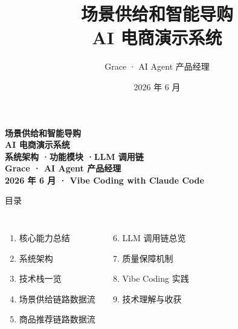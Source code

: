\documentclass[aspectratio=169, UTF8]{ctexbeamer}
\title{场景供给和智能导购\\AI 电商演示系统}
\author{Grace \;·\; AI Agent 产品经理}
\date{2026 年 6 月}
\begin{document}
\begin{frame}[plain]
  \vspace{2cm}
  \begin{center}
    {\huge\bfseries\color{primarydark} 场景供给和智能导购 \\
      \normalsize AI 电商演示系统 \\[1em]
      \Large\color{textgray} 系统架构 \quad·\quad 功能模块 \quad·\quad LLM 调用链 \\[2em]
      \normalsize\color{border} Grace \;·\; AI Agent 产品经理 \\
      2026 年 6 月 \;·\; Vibe Coding with Claude Code
    }
  \end{center}
\end{frame}

\begin{frame}{目录}
  \begin{columns}[T]
    \begin{enumerate}
      \item 核心能力总结
      \item 系统架构
      \item 技术栈一览
      \item 场景供给链路数据流
      \item 商品推荐链路数据流
    \end{enumerate}
    \begin{enumerate}
      \setcounter{enumi}{5}
      \item LLM 调用链总览
      \item 质量保障机制
      \item Vibe Coding 实践
      \item 技术理解与收获
    \end{enumerate}
  \end{columns}
\end{frame}
\end{document}
